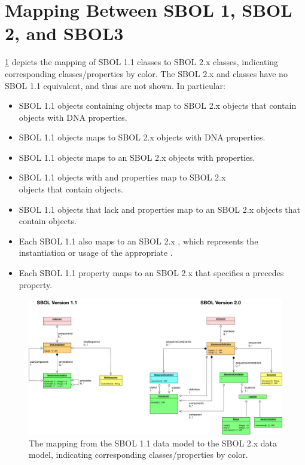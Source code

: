 \section{Mapping Between SBOL 1, SBOL 2, and SBOL3}
\label{sec:mapping}

\ref{SBOL1TO2} depicts the mapping of SBOL 1.1 classes to SBOL 2.x classes, indicating corresponding classes/properties by color.
The SBOL 2.x  and  classes have no SBOL 1.1 equivalent, and thus are not shown.
In particular:
\begin{itemize}
\item SBOL 1.1  objects containing  objects map to SBOL 2.x  objects that contain  objects with DNA  properties.
\item SBOL 1.1  objects maps to SBOL 2.x  objects with DNA  properties.
\item SBOL 1.1  objects maps to an SBOL 2.x  objects with   properties.
\item SBOL 1.1  objects with  and  properties map to SBOL 2.x\\
 objects that contain  objects.
\item SBOL 1.1  objects that lack  and  properties map to an SBOL 2.x  objects that contain  objects.
\item Each SBOL 1.1  also maps to an SBOL 2.x , which represents the instantiation or usage of the appropriate .
\item Each SBOL 1.1  property maps to an SBOL 2.x  that specifies a precedes  property.
\end{itemize}

\begin{figure}[h]
\begin{center}
  \includegraphics[width=\textwidth]{images/sbol_v1_to_v2}
\end{center}
\caption{\label{SBOL1TO2}The mapping from the SBOL 1.1 data model to the SBOL 2.x  data model, indicating corresponding classes/properties by color.}
\end{figure}
